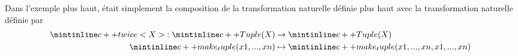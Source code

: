 Dans l'exemple plus haut,  était simplement la composition
de la transformation naturelle  définie plus haut avec la
transformation naturelle  définie par
\begin{align*}
    \icpp{twice<X>} : \icpp{Tuple(X)} &\to \icpp{Tuple(X)} \\
                      \icpp{make_tuple(x1, ..., xn)} &\mapsto \icpp{make_tuple(x1, ..., xn, x1, ..., xn)}
\end{align*}
